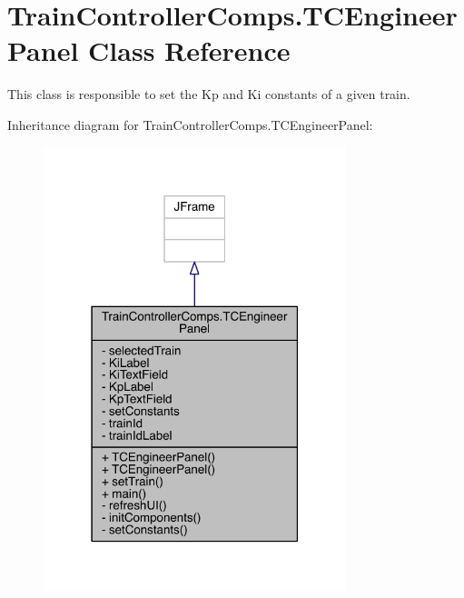 \hypertarget{classTrainControllerComps_1_1TCEngineerPanel}{}\section{Train\+Controller\+Comps.\+T\+C\+Engineer\+Panel Class Reference}
\label{classTrainControllerComps_1_1TCEngineerPanel}


This class is responsible to set the Kp and Ki constants of a given train.  




Inheritance diagram for Train\+Controller\+Comps.\+T\+C\+Engineer\+Panel\+:
\nopagebreak
\begin{figure}[H]
\begin{center}
\leavevmode
\includegraphics[width=250pt]{classTrainControllerComps_1_1TCEngineerPanel__inherit__graph}
\end{center}
\end{figure}



